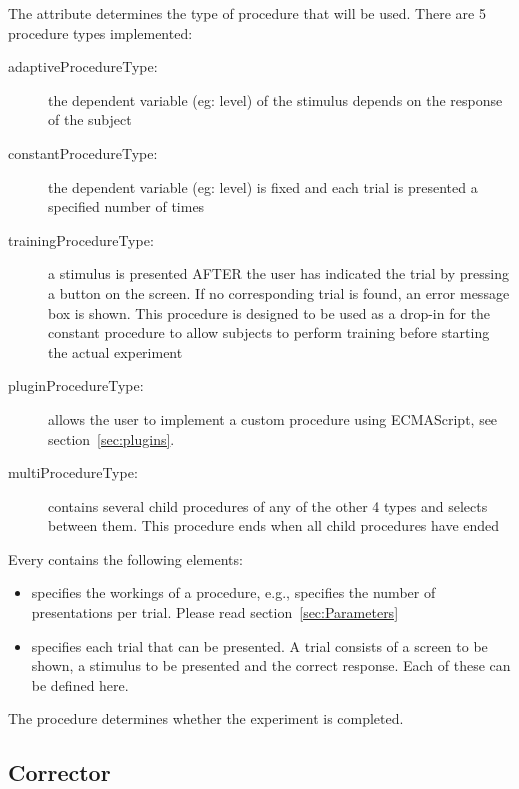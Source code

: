
The  attribute determines the type of
procedure that will be used. There are 5 procedure types
implemented:

\begin{description} \item [adaptiveProcedureType:] the dependent variable (eg: level) of the
stimulus depends on the response of the subject \item
[constantProcedureType:] the dependent variable (eg: level) is
fixed and each trial is presented a specified number of times
\item [trainingProcedureType:] a stimulus is presented AFTER the
user has indicated the trial by pressing a button on the screen.
If no corresponding trial is found, an error message box is shown.
This procedure is designed to be used as a drop-in for the
constant procedure to allow subjects to perform training before
starting the actual experiment

\item [pluginProcedureType:] allows the user to implement a custom
procedure using ECMAScript, see section~\ref{sec:plugins}.

\item [multiProcedureType:] contains several child procedures of any of the other 4 types and
selects between them. This procedure ends when all child
procedures have ended
\end{description}

Every  contains the following elements:

\begin{itemize}
\item {} specifies the workings of a procedure,
e.g., specifies the number of presentations per trial. Please read
section~\ref{sec:Parameters} \item {} specifies each
trial that can be presented. A trial consists of a screen to be
shown, a stimulus to be presented and the correct response. Each
of these can be defined here.
\end{itemize}

The procedure determines whether the experiment is completed.

\subsection{Corrector}

